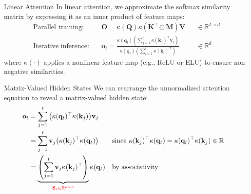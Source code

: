 \documentclass{beamer}
\makeatletter
\newcommand{\eg}{e.g.\@\xspace}
\makeatother
\begin{document}
\begin{frame}{Linear Attention}
	In linear attention, we approximate the softmax similarity matrix by expressing it as an inner product of feature maps:
	\begin{align*}
		\text{Parallel training:} \quad   & \mathbf{O} = \kappa(\mathbf{Q})\kappa(\mathbf{K}^\top \odot \mathbf{M})\mathbf{V}                                                                                                         &  & \in \mathbb{R}^{L \times d} \\
		\text{Iterative inference:} \quad & \mathbf{o}_t = \frac{\kappa(\mathbf{q}_t) \left( \sum_{j=1}^t \kappa(\mathbf{k}_j)^\top \mathbf{v}_j \right)}{\kappa(\mathbf{q}_t) \left( \sum_{l=1}^t \kappa(\mathbf{k}_l)^\top \right)} &  & \in \mathbb{R}^d
	\end{align*}
	where $\kappa(\cdot)$ applies a nonlinear feature map (\eg, ReLU or ELU) to ensure non-negative similarities.
\end{frame}
\begin{frame}{Matrix-Valued Hidden States}
	We can rearrange the unnormalized attention equation to reveal a matrix-valued hidden state: \begin{align*}
		\mathbf{o}_t & = \sum_{j=1}^t \big(\kappa(\mathbf{q}_t)^\top \kappa(\mathbf{k}_j)\big)\mathbf{v}_j                                                                                                                                                                                                                  \\
		             & = \sum_{j=1}^t \mathbf{v}_j\big(\kappa(\mathbf{k}_j)^\top \kappa(\mathbf{q}_t)\big)                                                                                &  & \text{since } \kappa(\mathbf{k}_j)^\top \kappa(\mathbf{q}_t) = \kappa(\mathbf{q}_t)^\top \kappa(\mathbf{k}_j) \in \mathbb{R} \\
		             & = \underbrace{\left( \sum_{j=1}^t \mathbf{v}_j \kappa(\mathbf{k}_j)^\top \right)}_{\textcolor{red}{\mathbf{S}_t \in \mathbb{R}^{d \times d}}} \kappa(\mathbf{q}_t) &  & \text{by associativity}
	\end{align*}
\end{frame}
\end{document}
